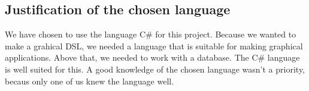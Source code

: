 \subsection{Justification of the chosen language}
We have chosen to use the language C\# for this project. Because we wanted to make a grahical DSL, we needed a language that is suitable for making graphical applications. Above that, we needed to work with a database. The C\# language is well suited for this. A good knowledge of the chosen language wasn't a priority, becaus only one of us knew the language well.
